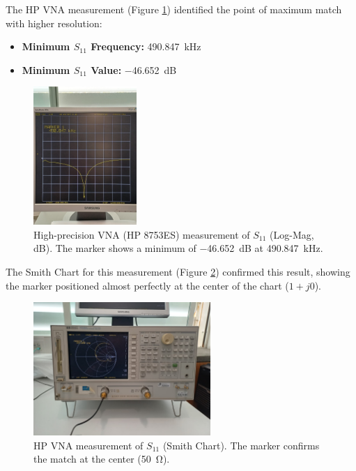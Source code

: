 The HP VNA measurement (Figure \ref{fig:vna_logmag}) identified the point of maximum match with higher resolution:
\begin{itemize}
    \item \textbf{Minimum $S_{11}$ Frequency:} \SI{490.847}{\kilo\hertz}
    \item \textbf{Minimum $S_{11}$ Value:} \SI{-46.652}{\deci\bel}
\end{itemize}

\begin{figure}[H]
    \centering
    \includegraphics[width=0.35\textwidth]{Images/vna_s11_logmag.jpeg}
    \caption{High-precision VNA (HP 8753ES) measurement of $S_{11}$ (Log-Mag, dB). The marker shows a minimum of \SI{-46.652}{\deci\bel} at \SI{490.847}{\kilo\hertz}.}
    \label{fig:vna_logmag}
\end{figure}

The Smith Chart for this measurement (Figure \ref{fig:vna_smith}) confirmed this result, showing the marker positioned almost perfectly at the center of the chart ($1+j0$).

\begin{figure}[H]
    \centering
    \includegraphics[width=0.6\textwidth]{Images/vna_s11_smith.jpeg}
    \caption{HP VNA measurement of $S_{11}$ (Smith Chart). The marker confirms the match at the center (\SI{50}{\ohm}).}
    \label{fig:vna_smith}
\end{figure}


